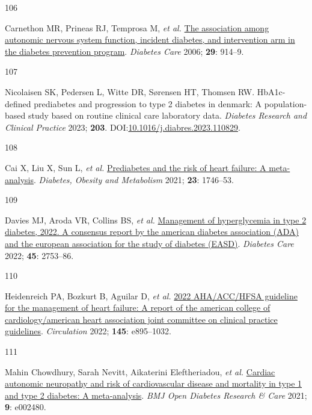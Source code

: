 \documentclass[
  a4paper,
  headsepline=true,
  open=any]{scrbook}
\newlength{\cslhangindent}
\newlength{\csllabelwidth}
\newlength{\cslentryspacingunit} %
\newenvironment{CSLReferences}[2] %
 {%
  \setlength{\parindent}{0pt}
  \ifodd #1
  \let\oldpar\par
  \def\par{\hangindent=\cslhangindent\oldpar}
  \fi
  \setlength{\parskip}{#2\cslentryspacingunit}
 }%
 {}
\newcommand{\CSLLeftMargin}[1]{\parbox[t]{\csllabelwidth}{#1}}
\newcommand{\CSLRightInline}[1]{\parbox[t]{\linewidth - \csllabelwidth}{#1}\break}
\begin{document}
\begin{CSLReferences}{0}{0}
\leavevmode{}%
\CSLLeftMargin{106 }%
\CSLRightInline{Carnethon MR, Prineas RJ, Temprosa M, \emph{et al.}
\href{https://doi.org/10.2337/diacare.29.04.06.dc05-1729}{The
association among autonomic nervous system function, incident diabetes,
and intervention arm in the diabetes prevention program}. \emph{Diabetes
Care} 2006; \textbf{29}: 914--9.}

\leavevmode{}%
\CSLLeftMargin{107 }%
\CSLRightInline{Nicolaisen SK, Pedersen L, Witte DR, Sørensen HT,
Thomsen RW. HbA1c-defined prediabetes and progression to type 2 diabetes
in denmark: A population-based study based on routine clinical care
laboratory data. \emph{Diabetes Research and Clinical Practice} 2023;
\textbf{203}.
DOI:\href{https://doi.org/10.1016/j.diabres.2023.110829}{10.1016/j.diabres.2023.110829}.}

\leavevmode{}%
\CSLLeftMargin{108 }%
\CSLRightInline{Cai X, Liu X, Sun L, \emph{et al.}
\href{https://doi.org/10.1111/dom.14388}{Prediabetes and the risk of
heart failure: A meta-analysis}. \emph{Diabetes, Obesity and Metabolism}
2021; \textbf{23}: 1746--53.}

\leavevmode{}%
\CSLLeftMargin{109 }%
\CSLRightInline{Davies MJ, Aroda VR, Collins BS, \emph{et al.}
\href{https://doi.org/10.2337/dci22-0034}{Management of hyperglycemia in
type 2 diabetes, 2022. A consensus report by the american diabetes
association (ADA) and the european association for the study of diabetes
(EASD)}. \emph{Diabetes Care} 2022; \textbf{45}: 2753--86.}

\leavevmode{}%
\CSLLeftMargin{110 }%
\CSLRightInline{Heidenreich PA, Bozkurt B, Aguilar D, \emph{et al.}
\href{https://doi.org/10.1161/CIR.0000000000001063}{2022 AHA/ACC/HFSA
guideline for the management of heart failure: A report of the american
college of cardiology/american heart association joint committee on
clinical practice guidelines}. \emph{Circulation} 2022; \textbf{145}:
e895--1032.}

\leavevmode{}%
\CSLLeftMargin{111 }%
\CSLRightInline{Mahin Chowdhury, Sarah Nevitt, Aikaterini Eleftheriadou,
\emph{et al.} \href{https://doi.org/10.1136/bmjdrc-2021-002480}{Cardiac
autonomic neuropathy and risk of cardiovascular disease and mortality in
type 1 and type 2 diabetes: A meta-analysis}. \emph{BMJ Open Diabetes
Research \& Care} 2021; \textbf{9}: e002480.}


\end{CSLReferences}
\end{document}
